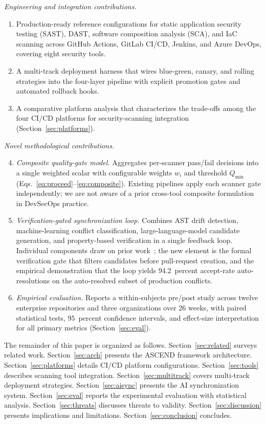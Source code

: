 \documentclass{ieeeaccess}
\begin{document}
\textit{Engineering and integration contributions.}
\begin{enumerate}
\item Production-ready reference configurations for static application security testing (SAST), DAST, software composition analysis (SCA), and IaC scanning across GitHub Actions, GitLab CI/CD, Jenkins, and Azure DevOps, covering eight security tools.
\item A multi-track deployment harness that wires blue-green, canary, and rolling strategies into the four-layer pipeline with explicit promotion gates and automated rollback hooks.
\item A comparative platform analysis that characterizes the trade-offs among the four CI/CD platforms for security-scanning integration (Section~\ref{sec:platforms}).
\end{enumerate}

\textit{Novel methodological contributions.}
\begin{enumerate}\setcounter{enumi}{3}
\item \textit{Composite quality-gate model.} Aggregates per-scanner pass/fail decisions into a single weighted scalar with configurable weights $w_i$ and threshold $Q_{\min}$ (Eqs.~\eqref{eq:proceed}--\eqref{eq:composite}). Existing pipelines apply each scanner gate independently; we are not aware of a prior cross-tool composite formulation in DevSecOps practice.
\item \textit{Verification-gated synchronization loop.} Combines AST drift detection, machine-learning conflict classification, large-language-model candidate generation, and property-based verification in a single feedback loop. Individual components draw on prior work~\cite{shen2019intellimerge,svyatkovskiy2022program,dinella2023deepmerge}; the new element is the formal verification gate that filters candidates before pull-request creation, and the empirical demonstration that the loop yields 94.2~percent accept-rate auto-resolutions on the auto-resolved subset of production conflicts.
\item \textit{Empirical evaluation.} Reports a within-subjects pre/post study across twelve enterprise repositories and three organizations over 26 weeks, with paired statistical tests, $95$~percent confidence intervals, and effect-size interpretation for all primary metrics (Section~\ref{sec:eval}).
\end{enumerate}

The remainder of this paper is organized as follows. Section~\ref{sec:related} surveys related work. Section~\ref{sec:arch} presents the ASCEND framework architecture. Section~\ref{sec:platforms} details CI/CD platform configurations. Section~\ref{sec:tools} describes scanning tool integration. Section~\ref{sec:multitrack} covers multi-track deployment strategies. Section~\ref{sec:aisync} presents the AI synchronization system. Section~\ref{sec:eval} reports the experimental evaluation with statistical analysis. Section~\ref{sec:threats} discusses threats to validity. Section~\ref{sec:discussion} presents implications and limitations. Section~\ref{sec:conclusion} concludes.
\end{document}
